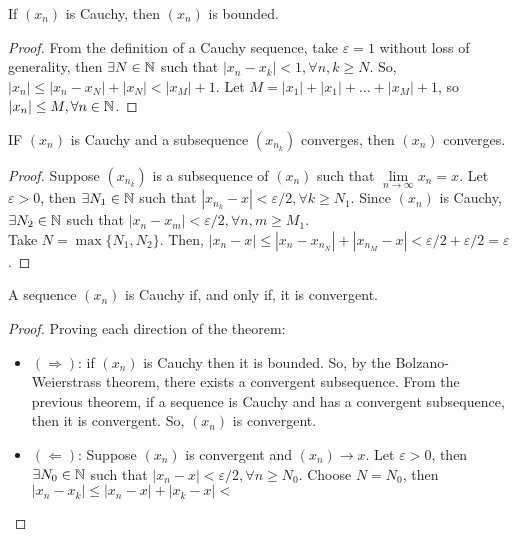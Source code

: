 \begin{theorem}
    If $(x_n)$ is Cauchy, then $(x_n)$ is bounded.
\end{theorem}

\begin{proof}
    From the definition of a Cauchy sequence, take $\varepsilon=1$ without loss of generality, then $\exists N \in \mathbb{N}$ such that $|x_n-x_k| < 1, \forall n, k \geq N$. So, $|x_n| \leq |x_n - x_N| + |x_N| < |x_M| + 1$. Let $M = |x_1| + |x_1| + ... + |x_M| + 1$, so $|x_n| \leq M, \forall n \in \mathbb{N}$.
\end{proof}

\begin{theorem}
    IF $(x_n)$ is Cauchy and a subsequence $(x_{n_k})$ converges, then $(x_n)$ converges.
\end{theorem}

\begin{proof}
    Suppose $(x_{n_k})$ is a subsequence of $(x_n)$ such that $\lim \limits_{n \to \infty} x_n = x$. Let $\varepsilon > 0$, then $\exists N_1 \in \mathbb{N}$ such that $|x_{n_k} - x| < \varepsilon/2, \forall k \geq N_1$. Since $(x_n)$ is Cauchy, $\exists N_2 \in \mathbb{N}$ such that $|x_n-x_m| < \varepsilon/2, \forall n, m \geq M_1$.\\
    Take $N = \max \{N_1, N_2\}$. Then, $|x_n-x| \leq |x_n-x_{n_N}| + |x_{n_M} - x| < \varepsilon/2  + \varepsilon/2 = \varepsilon$.
\end{proof}

\begin{theorem}
    A sequence $(x_n)$ is Cauchy if, and only if, it is convergent.
\end{theorem}

\begin{proof}
    Proving each direction of the theorem:
    \begin{itemize}
        \item $(\Longrightarrow)$: if $(x_n)$ is Cauchy then it is bounded. So, by the Bolzano-Weierstrass theorem, there exists a convergent subsequence. From the previous theorem, if a sequence is Cauchy and has a convergent subsequence, then it is convergent. So, $(x_n)$ is convergent.
        \item $(\Longleftarrow)$: Suppose $(x_n)$ is convergent and $(x_n) \to x$. Let $\varepsilon > 0$, then $\exists N_0 \in \mathbb{N}$ such that $|x_n - x| < \varepsilon/2, \forall n \geq N_0$. Choose $N = N_0$, then $|x_n-x_k| \leq |x_n-x| + |x_k-x| < $
    \end{itemize}
\end{proof}

